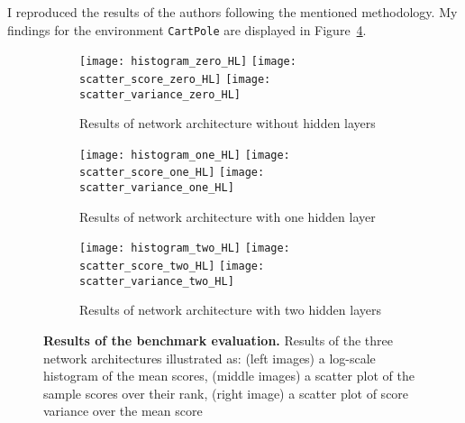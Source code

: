I reproduced the results of the authors following the mentioned methodology. My findings for the environment \verb|CartPole| are displayed in Figure~\ref{fig:plots_reproduced}.
\begin{figure}[ht]
\centering
\begin{subfigure}{\textwidth}
  \centering
  \texttt{[image: histogram\_zero\_HL]}
  \texttt{[image: scatter\_score\_zero\_HL]}
  \texttt{[image: scatter\_variance\_zero\_HL]}
    \caption{Results of network architecture without hidden layers}
    \label{fig:plots_reproduced_first}
\end{subfigure}
\begin{subfigure}{\textwidth}
  \centering
  \texttt{[image: histogram\_one\_HL]}
  \texttt{[image: scatter\_score\_one\_HL]}
  \texttt{[image: scatter\_variance\_one\_HL]}
    \caption{Results of network architecture with one hidden layer}
    \label{fig:plots_reproduced_second}
\end{subfigure}
\begin{subfigure}{\textwidth}
  \centering
  \texttt{[image: histogram\_two\_HL]}
  \texttt{[image: scatter\_score\_two\_HL]}
  \texttt{[image: scatter\_variance\_two\_HL]}
    \caption{Results of network architecture with two hidden layers}
    \label{fig:plots_reproduced_third}
\end{subfigure}
\caption[Reproduced Plots]{
  \textbf{Results of the benchmark evaluation.}
   Results of the three network architectures illustrated as: (left images) a log-scale histogram of the mean scores, (middle images) a scatter plot of the sample scores over their rank, (right image) a scatter plot of score variance over the mean score
}
\label{fig:plots_reproduced}
\end{figure}
